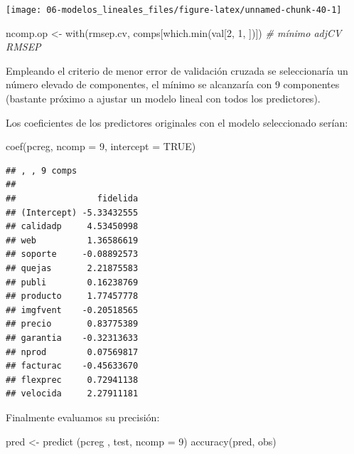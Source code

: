 \documentclass[
]{book}
\newenvironment{Shaded}{\begin{snugshade}}{\end{snugshade}}
\newcommand{\AttributeTok}[1]{\textcolor[rgb]{0.77,0.63,0.00}{#1}}
\newcommand{\CommentTok}[1]{\textcolor[rgb]{0.56,0.35,0.01}{\textit{#1}}}
\newcommand{\ConstantTok}[1]{\textcolor[rgb]{0.00,0.00,0.00}{#1}}
\newcommand{\DecValTok}[1]{\textcolor[rgb]{0.00,0.00,0.81}{#1}}
\newcommand{\FunctionTok}[1]{\textcolor[rgb]{0.00,0.00,0.00}{#1}}
\newcommand{\NormalTok}[1]{#1}
\newcommand{\OtherTok}[1]{\textcolor[rgb]{0.56,0.35,0.01}{#1}}
\theoremstyle{break}
\theoremstyle{definition}
\theoremstyle{definition}
\theoremstyle{definition}
\theoremstyle{definition}
\theoremstyle{remark}
\begin{document}
\begin{center}\texttt{[image: 06-modelos\_lineales\_files/figure-latex/unnamed-chunk-40-1]} \end{center}

\begin{Shaded}
\begin{Highlighting}[]
\NormalTok{ncomp.op }\OtherTok{\textless{}{-}} \FunctionTok{with}\NormalTok{(rmsep.cv, comps[}\FunctionTok{which.min}\NormalTok{(val[}\DecValTok{2}\NormalTok{, }\DecValTok{1}\NormalTok{, ])]) }\CommentTok{\# mínimo adjCV RMSEP}
\end{Highlighting}
\end{Shaded}

Empleando el criterio de menor error de validación cruzada se seleccionaría un número elevado de componentes, el mínimo se alcanzaría con 9 componentes (bastante próximo a ajustar un modelo lineal con todos los predictores).

Los coeficientes de los predictores originales con el modelo seleccionado serían:

\begin{Shaded}
\begin{Highlighting}[]
\FunctionTok{coef}\NormalTok{(pcreg, }\AttributeTok{ncomp =} \DecValTok{9}\NormalTok{, }\AttributeTok{intercept =} \ConstantTok{TRUE}\NormalTok{)}
\end{Highlighting}
\end{Shaded}

\begin{verbatim}
## , , 9 comps
## 
##                fidelida
## (Intercept) -5.33432555
## calidadp     4.53450998
## web          1.36586619
## soporte     -0.08892573
## quejas       2.21875583
## publi        0.16238769
## producto     1.77457778
## imgfvent    -0.20518565
## precio       0.83775389
## garantia    -0.32313633
## nprod        0.07569817
## facturac    -0.45633670
## flexprec     0.72941138
## velocida     2.27911181
\end{verbatim}

Finalmente evaluamos su precisión:

\begin{Shaded}
\begin{Highlighting}[]
\NormalTok{pred }\OtherTok{\textless{}{-}} \FunctionTok{predict}\NormalTok{ (pcreg , test, }\AttributeTok{ncomp =} \DecValTok{9}\NormalTok{)}
\FunctionTok{accuracy}\NormalTok{(pred, obs)}
\end{Highlighting}
\end{Shaded}
\end{document}
